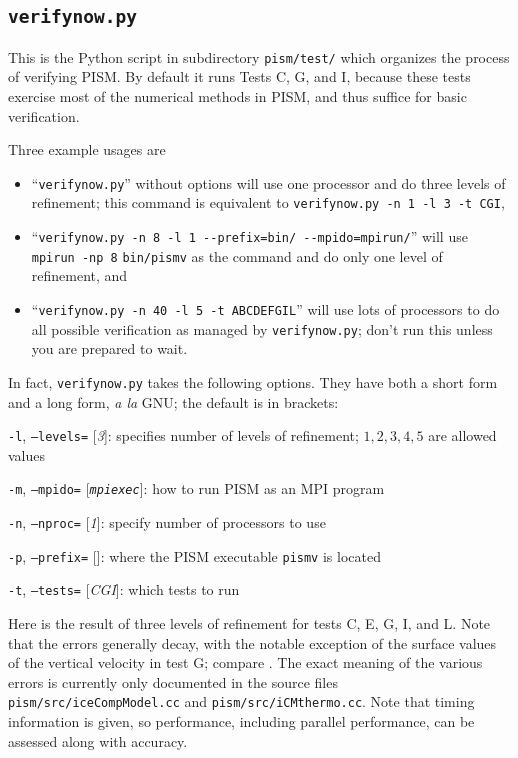 \documentclass[11pt,final]{amsart}
\newcommand{\optoptdef}[3]{\vspace{1mm}\noindent \large\texttt{-#1},\,\,\texttt{--#2=}\normalsize\,\,[\textsl{#3}]:\quad}
\begin{document}
\subsection{\texttt{verifynow.py}}  This is the Python script in subdirectory \verb|pism/test/| which organizes the process of verifying PISM.  By default it runs Tests C, G, and I, because these tests exercise most of the numerical methods in PISM, and thus suffice for basic verification.

Three example usages are \begin{itemize}
\item ``\verb|verifynow.py|'' without options will use one processor and do three levels of refinement; this command is equivalent to \verb|verifynow.py -n 1 -l 3 -t CGI|,
\item ``\verb|verifynow.py -n 8 -l 1 --prefix=bin/ --mpido=mpirun/|'' will use \verb|mpirun -np 8| \verb|bin/pismv| as the command and do only one level of refinement, and
\item ``\verb|verifynow.py -n 40 -l 5 -t ABCDEFGIL|'' will use lots of processors to do all possible verification as managed by \verb|verifynow.py|; don't run this unless you are prepared to wait.
\end{itemize}

\noindent In fact, \verb|verifynow.py| takes the following options.  They have both a short form and a long form, \emph{a la} GNU; the default is in brackets:

\optoptdef{l}{levels}{3} specifies number of levels of refinement; $1,2,3,4,5$ are allowed values

\optoptdef{m}{mpido}{\texttt{mpiexec}} how to run PISM as an MPI program

\optoptdef{n}{nproc}{1} specify number of processors to use

\optoptdef{p}{prefix}{} where the PISM executable \verb|pismv| is located

\optoptdef{t}{tests}{CGI} which tests to run

\medskip
Here is the result of three levels of refinement for tests C, E, G, I, and L.  Note that the errors generally decay, with the notable exception of the surface values of the vertical velocity in test G; compare \cite{SaitoMargin}.  The exact meaning of the various errors is currently only documented in the source files \verb|pism/src/iceCompModel.cc| and \verb|pism/src/iCMthermo.cc|.  Note that timing information is given, so performance, including parallel performance, can be assessed along with accuracy.
\end{document}
